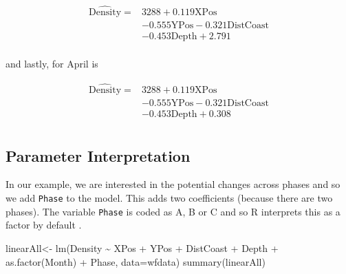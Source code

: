 \documentclass[
  oneside]{krantz}
\newenvironment{Shaded}{\begin{snugshade}}{\end{snugshade}}
\newcommand{\AttributeTok}[1]{\textcolor[rgb]{0.77,0.63,0.00}{#1}}
\newcommand{\FunctionTok}[1]{\textcolor[rgb]{0.00,0.00,0.00}{#1}}
\newcommand{\NormalTok}[1]{#1}
\newcommand{\OtherTok}[1]{\textcolor[rgb]{0.56,0.35,0.01}{#1}}
\newcommand{\SpecialCharTok}[1]{\textcolor[rgb]{0.00,0.00,0.00}{#1}}
\begin{document}
\begin{align}
\widehat{\textrm{Density}} = & 3288 + 0.119\textrm{XPos} \\
& -0.555\textrm{YPos} - 0.321\textrm{DistCoast} \\
& - 0.453 \textrm{Depth} + 2.791\\
\end{align}

and lastly, for April is

\begin{align}
\widehat{\textrm{Density}} = & 3288 + 0.119\textrm{XPos} \\
& -0.555\textrm{YPos} - 0.321\textrm{DistCoast} \\
& - 0.453 \textrm{Depth} + 0.308\\
\end{align}

\hypertarget{parameter-interpretation}{%
\subsection{Parameter Interpretation}\label{parameter-interpretation}}

In our example, we are interested in the potential changes across phases and so we add \texttt{Phase} to the model. This adds two coefficients (because there are two phases). The variable \texttt{Phase} is coded as A, B or C and so R interprets this as a factor by default .

\scriptsize

\begin{Shaded}
\begin{Highlighting}[]
\NormalTok{linearAll}\OtherTok{\textless{}{-}} \FunctionTok{lm}\NormalTok{(Density }\SpecialCharTok{\textasciitilde{}}\NormalTok{ XPos }\SpecialCharTok{+}\NormalTok{ YPos }\SpecialCharTok{+}\NormalTok{ DistCoast }\SpecialCharTok{+}\NormalTok{ Depth }\SpecialCharTok{+} \FunctionTok{as.factor}\NormalTok{(Month) }\SpecialCharTok{+}\NormalTok{ Phase, }\AttributeTok{data=}\NormalTok{wfdata)}
\FunctionTok{summary}\NormalTok{(linearAll)}
\end{Highlighting}
\end{Shaded}
\end{document}
